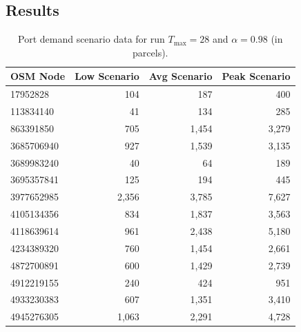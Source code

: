 \documentclass[12pt]{article}
\begin{document}
\subsection{Results}
\label{subsec:appendix-results}

\begin{table}[htbp]
  \centering
  \caption{Port demand scenario data for run \(T_{\max}=28\) and \(\alpha=0.98\) (in parcels).}
  \label{anx:port_demand_scenarios_t28_a098}
  \begin{tabular}{lrrr}
    \toprule
    \textbf{OSM Node} & \textbf{Low Scenario} & \textbf{Avg Scenario} & \textbf{Peak Scenario} \\
    \midrule
    17952828          & 104                   & 187                   & 400                    \\
    113834140         & 41                    & 134                   & 285                    \\
    863391850         & 705                   & 1,454                 & 3,279                  \\
    3685706940        & 927                   & 1,539                 & 3,135                  \\
    3689983240        & 40                    & 64                    & 189                    \\
    3695357841        & 125                   & 194                   & 445                    \\
    3977652985        & 2,356                 & 3,785                 & 7,627                  \\
    4105134356        & 834                   & 1,837                 & 3,563                  \\
    4118639614        & 961                   & 2,438                 & 5,180                  \\
    4234389320        & 760                   & 1,454                 & 2,661                  \\
    4872700891        & 600                   & 1,429                 & 2,739                  \\
    4912219155        & 240                   & 424                   & 951                    \\
    4933230383        & 607                   & 1,351                 & 3,410                  \\
    4945276305        & 1,063                 & 2,291                 & 4,728                  \\

\end{tabular}
\end{table}
\end{document}

